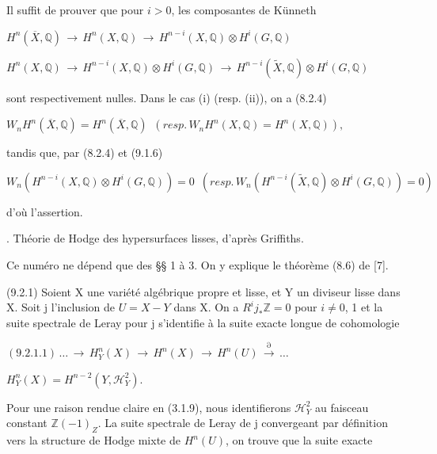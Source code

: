 \documentclass[11pt,twoside]{article}
\newcommand{\DFormula}[1]{%
  \par\smallskip\noindent\hspace*{0pt}\(\displaystyle #1\)\par\smallskip
}
\begin{document}
Il suffit de prouver que pour \(i>0\), les composantes de Künneth\par
\par\medskip
\DFormula{H^{n}(\overline{X},\mathbb{Q})\,\to \,H^{n}(X,\mathbb{Q})\,\to \,H^{n−i}(X,\mathbb{Q})\otimes H^{i}(G,\mathbb{Q})}
\par\medskip
\DFormula{H^{n}(X,\mathbb{Q})\,\to \,H^{n−i}(X,\mathbb{Q})\otimes H^{i}(G,\mathbb{Q})\,\to \,H^{n−i}(\widetilde{X},\mathbb{Q})\otimes H^{i}(G,\mathbb{Q})}
\par\medskip
sont respectivement nulles. Dans le cas (i) (resp. (ii)), on a (8.2.4)\par
\par\medskip
\DFormula{W_{n}H^{n}(\overline{X},\mathbb{Q})=H^{n}(\overline{X},\mathbb{Q})\,\,\,(resp.\,W_{n}H^{n}(X,\mathbb{Q})=H^{n}(X,\mathbb{Q})),}
\par\medskip
tandis que, par (8.2.4) et (9.1.6)\par
\par\medskip
\DFormula{W_{n}(H^{n−i}(X,\mathbb{Q})\otimes H^{i}(G,\mathbb{Q}))=0\,\,\,(resp.\,W_{n}(H^{n−i}(\widetilde{X},\mathbb{Q})\otimes H^{i}(G,\mathbb{Q}))=0)}
\par\medskip
d’où l’assertion.\par
\par{}. Théorie de Hodge des hypersurfaces lisses, d’après Griffiths.\par
\par\medskip
Ce numéro ne dépend que des §§ 1 à 3. On y explique le théorème (8.6) de [7].\par
\par\medskip
(9.2.1) Soient X une variété algébrique propre et lisse, et Y un diviseur lisse dans X. Soit j l’inclusion de \(U=X−Y\) dans X. On a \(R^{i}j_{\ast }\mathbb{Z}=0\) pour \(i\neq 0\), 1 et la suite spectrale de Leray pour j s’identifie à la suite exacte longue de cohomologie\par
\par\medskip
\DFormula{(9.2.1.1)\,…\,\to \,H_{Y}^{n}(X)\,\to \,H^{n}(X)\,\to \,H^{n}(U)\,\xrightarrow{\partial }\,…}
\par\medskip
\DFormula{H_{Y}^{n}(X)=H^{n−2}(Y,\mathcal{H}_{Y}^{2}).}
\par\medskip
Pour une raison rendue claire en (3.1.9), nous identifierons \(\mathcal{H}_{Y}^{2}\) au faisceau constant \(\mathbb{Z}(−1)_{Z}\). La suite spectrale de Leray de j convergeant par définition vers la structure de Hodge mixte de \(H^{n}(U)\), on trouve que la suite exacte\par
\end{document}
